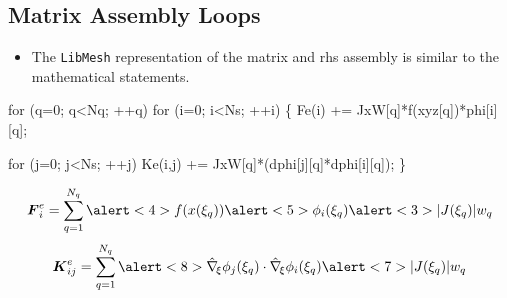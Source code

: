 \subsection*{Matrix Assembly Loops}
\begin{frame}[fragile,t]  
	\begin{block}{}
	  \begin{itemize}    
	  \item{ The \texttt{LibMesh} representation of the matrix and
	    rhs assembly is similar to the mathematical statements.
	  }
	  \end{itemize}
	\end{block}
\small
\begin{semiverbatim}
for (q=0; q<Nq; ++q) 
  for (i=0; i<Ns; ++i) \{
    \alert<2>{Fe(i)   += \alert<3>{JxW[q]}*\alert<4>{f(xyz[q])}*\alert<5>{phi[i][q]};}
    
    for (j=0; j<Ns; ++j)
      \alert<6>{Ke(i,j) += \alert<7>{JxW[q]}*(\alert<8>{dphi[j][q]*dphi[i][q]});}
  \}
\end{semiverbatim}
{
  \begin{equation}
    \nonumber
    \bv{F}^e_{i} = 
    \sum_{q=1}^{N_q}
    \alert<4>{f(x(\xi_q))}
    \alert<5>{\phi_i(\xi_q)}
    \alert<3>{|J(\xi_q)| w_q}
  \end{equation}
}
{
  \begin{equation}
  \nonumber
  \bv{K}^e_{ij} =
  \sum_{q=1}^{N_q}
  \alert<8>{
    \hat{\nabla}_{\!\xi} \phi_j(\xi_q) \cdot
    \hat{\nabla}_{\!\xi} \phi_i(\xi_q)
    }
  \alert<7>{|J(\xi_q)| w_q}
  \end{equation}
}
\end{frame}
